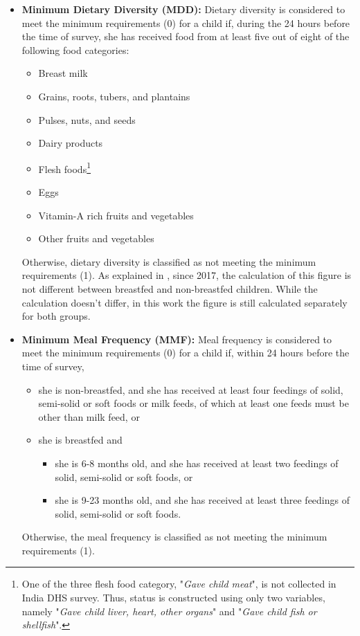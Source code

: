 \documentclass[12pt,a4paper,notitlepage]{article}
\begin{document}
\begin{itemize}
    \begin{itemize}
        \item \textbf{Minimum Dietary Diversity (MDD):} Dietary diversity is considered to meet the minimum requirements (0) for a child if, during the 24 hours before the time of survey, she has received food from at least five out of eight of the following food categories:
        \begin{itemize}
            \item Breast milk
            \item Grains, roots, tubers, and plantains
            \item Pulses, nuts, and seeds
            \item Dairy products
            \item Flesh foods\footnote{One of the three flesh food category, "\textit{Gave child meat}", is not collected in India DHS survey. Thus, status is constructed using only two variables, namely "\textit{Gave child liver, heart, other organs}" and "\textit{Gave child fish or shellfish}".}
            \item Eggs
            \item Vitamin-A rich fruits and vegetables
            \item Other fruits and vegetables
        \end{itemize}
        Otherwise, dietary diversity is classified as not meeting the minimum requirements (1). As explained in \citet{who2021FoodIndicators}, since 2017, the calculation of this figure is not different between breastfed and non-breastfed children. While the calculation doesn't differ, in this work the figure is still calculated separately for both groups.

        \item \textbf{Minimum Meal Frequency (MMF):} Meal frequency is considered to meet the minimum requirements (0) for a child if, within 24 hours before the time of survey,
        \begin{itemize}
            \item she is non-breastfed, and she has received at least four feedings of solid, semi-solid or soft foods or milk feeds, of which at least one feeds must be other than milk feed, or
            \item she is breastfed and
            \begin{itemize}
                \item she is 6-8 months old, and she has received at least two feedings of solid, semi-solid or soft foods, or
                \item she is 9-23 months old, and she has received at least three feedings of solid, semi-solid or soft foods.
            \end{itemize}
        \end{itemize}
        Otherwise, the meal frequency is classified as not meeting the minimum requirements (1).


\end{itemize}
\end{itemize}
\end{document}
